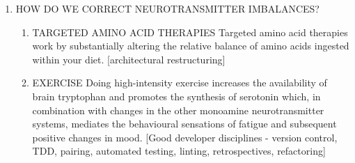 \documentclass[11pt]{article}
\begin{document}
\begin{enumerate}
\begin{enumerate}
\begin{enumerate}
\item HOW DO WE CORRECT NEUROTRANSMITTER IMBALANCES?
\label{sec:org5ec7f8b}

\begin{enumerate}
\item TARGETED AMINO ACID THERAPIES
\label{sec:orgb17bde6}
Targeted amino acid therapies work by substantially altering the relative balance of amino acids ingested within your diet. [architectural restructuring]

\item EXERCISE
\label{sec:org7e4fcd9}
Doing high-intensity exercise increases the availability of brain tryptophan and promotes the synthesis of serotonin which, in combination with changes in the other monoamine neurotransmitter systems, mediates the behavioural
sensations of fatigue and subsequent positive changes in mood. [Good developer disciplines - version control, TDD, pairing, automated testing, linting, retrospectives, refactoring]
\end{enumerate}
\end{enumerate}
\end{enumerate}
\end{enumerate}
\end{document}
